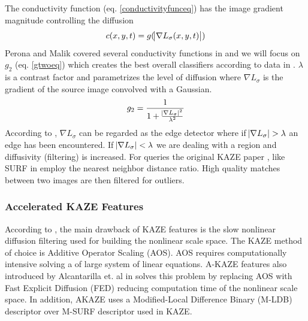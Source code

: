 \documentclass[english,12pt,a4paper,pdftex,elec,utf8, table]{aaltothesis}
\begin{document}
The conductivity function (eq. \ref{conductivityfunceq}) has the image gradient magnitude controlling the diffusion
\begin{equation}
  \label{conductivityfunceq}
c(x,y,t)=g(\abs{\nabla L_\sigma(x,y,t)})
\end{equation}
Perona and Malik covered several conductivity functions in \cite{Perona1990} and we will focus on $g_2$ (eq. \ref{gtwoeq}) which creates the best overall classifiers according to data in \cite{Alcantarilla2012}. $\lambda$ is a contrast factor and parametrizes the level of diffusion where $\nabla L_{\sigma}$ is the gradient of the source image convolved with a Gaussian.
\begin{equation}
  \label{gtwoeq}
g_2 = \frac{1}{1 + \frac{\abs{\nabla L_\sigma}^{2}}{\lambda^{2}}}
\end{equation}
According to \cite{Weickert1998}, $\nabla L_{\sigma}$ can be regarded as the edge detector where if $\abs{\nabla L_{\sigma}} > \lambda$ an edge has been encountered. If $\abs{\nabla L_{\sigma}} < \lambda$ we are dealing with a region and diffusivity (filtering) is increased. For queries the original KAZE paper \cite{Alcantarilla2012}, like SURF in \cite{Bay2006} employ the nearest neighbor distance ratio. High quality matches between two images are then filtered for outliers.

\subsubsection{Accelerated KAZE Features}
According to \cite{Alcantarilla2012}, the main drawback of KAZE features is the slow nonlinear diffusion filtering used for building the nonlinear scale space.  The KAZE method of choice is Additive Operator Scaling (AOS). AOS requires computationally intensive solving a of large system of linear equations. A-KAZE features also introduced by Alcantarilla et. al in solves this problem by replacing AOS with Fast Explicit Diffusion (FED) reducing computation time of the nonlinear scale space. In addition, AKAZE uses a Modified-Local Difference Binary (M-LDB) descriptor over M-SURF descriptor used in KAZE.
\end{document}
